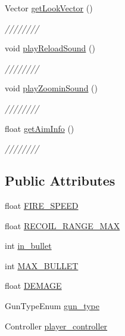 \begin{DoxyCompactItemize}
Vector \hyperlink{class_weapons___actor_a6963343558cb76d4bf1d2ae105c35bff}{get\+Look\+Vector} ()
\begin{DoxyCompactList}\small\item\em //////// \end{DoxyCompactList}\item 
void \hyperlink{class_weapons___actor_a0c8b9ce144acf091d45cbb640409f76e}{play\+Reload\+Sound} ()
\begin{DoxyCompactList}\small\item\em //////// \end{DoxyCompactList}\item 
void \hyperlink{class_weapons___actor_a516b61bac1106db521e14a13655a2006}{play\+Zoomin\+Sound} ()
\begin{DoxyCompactList}\small\item\em //////// \end{DoxyCompactList}\item 
float \hyperlink{class_weapons___actor_a4075270dddcd840e6996ce3062acca46}{get\+Aim\+Info} ()
\begin{DoxyCompactList}\small\item\em //////// \end{DoxyCompactList}\end{DoxyCompactItemize}
\subsection*{Public Attributes}
\begin{DoxyCompactItemize}
\item 
float \hyperlink{class_weapons___actor_acb9cfe5f22387762744bf5badabe4336}{F\+I\+R\+E\+\_\+\+S\+P\+E\+ED}
\item 
float \hyperlink{class_weapons___actor_aa175cd3f4bb5dfd572fc56c966deb105}{R\+E\+C\+O\+I\+L\+\_\+\+R\+A\+N\+G\+E\+\_\+\+M\+AX}
\item 
int \hyperlink{class_weapons___actor_a3ada6991a9ec6db336c9ebc5af923c3d}{in\+\_\+bullet}
\item 
int \hyperlink{class_weapons___actor_a50e014c2ea202f57948e3cd81ca22491}{M\+A\+X\+\_\+\+B\+U\+L\+L\+ET}
\item 
float \hyperlink{class_weapons___actor_aea43a4cdbf104cbb2a46112a14488bfd}{D\+E\+M\+A\+GE}
\item 
Gun\+Type\+Enum \hyperlink{class_weapons___actor_a4707d7bf1fa123913b897bddfc0a2684}{gun\+\_\+type}
\item 
Controller \hyperlink{class_weapons___actor_aad6b8ee12d9a949b589c7b70721fd28a}{player\+\_\+controller}
\end{DoxyCompactItemize}
